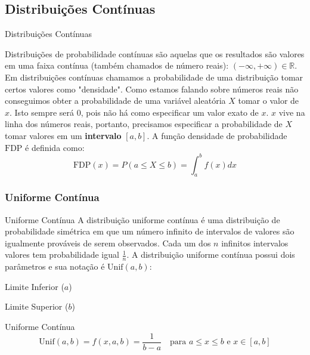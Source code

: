 
\subsection{Distribuições Contínuas}
\begin{frame}{Distribuições Contínuas}
    \begin{defn}
        \small
        Distribuições de probabilidade contínuas são aquelas que os resultados
        são valores em uma faixa contínua (também chamados de número reais):
        $(-\infty, +\infty) \in \mathbb{R}$.
        Em distribuições contínuas chamamos a probabilidade de uma distribuição
        tomar certos valores como "densidade". Como estamos falando sobre
        números reais não conseguimos obter a probabilidade de uma variável aleatória
        $X$ tomar o valor de $x$. Isto sempre será $0$, pois não há como especificar
        um valor exato de $x$. $x$ vive na linha dos números reais, portanto,
        precisamos especificar a probabilidade de $X$ tomar valores em um \textbf{intervalo}
        $[a,b]$. A função densidade de probabilidade $\text{FDP}$ é definida como:
        $$\text{FDP}(x) = P(a \leq X \leq b) = \int_a^b f(x) dx$$
    \end{defn}
\end{frame}

\subsubsection{Uniforme Contínua}
\begin{frame}{Uniforme Contínua}
    A distribuição uniforme contínua é uma distribuição de probabilidade simétrica em que um número infinito de intervalos de valores
    são igualmente prováveis de serem observados. Cada um dos $n$ infinitos intervalos valores tem probabilidade igual $\frac{1}{n}$.
    \vfill
    A distribuição uniforme contínua possui dois parâmetros e sua notação é $\text{Unif}(a, b)$:
    \begin{vfilleditems}
        \item Limite Inferior ($a$)
        \item Limite Superior ($b$)
    \end{vfilleditems}
\end{frame}

\begin{frame}{Uniforme Contínua}
    $$\text{Unif}(a,b) = f(x, a, b) = \frac{1}{b-a} \quad \text{para $a \leq x \leq b$ e $x \in [a, b]$}$$
\end{frame}

